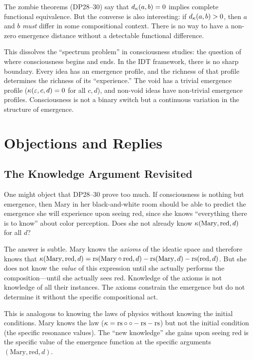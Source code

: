 The zombie theorems (DP28--30) say that $d_{\kappa}(a,b) = 0$
implies complete functional equivalence.  But the converse is
also interesting: if $d_{\kappa}(a,b) > 0$, then $a$ and $b$
\emph{must} differ in some compositional context.  There is no
way to have a non-zero emergence distance without a detectable
functional difference.

This dissolves the ``spectrum problem'' in consciousness studies:
the question of where consciousness begins and ends.  In the IDT
framework, there is no sharp boundary.  Every idea has an emergence
profile, and the richness of that profile determines the richness
of its ``experience.''  The void has a trivial emergence profile
($\kappa(\varepsilon, c, d) = 0$ for all $c, d$), and non-void ideas
have non-trivial emergence profiles.  Consciousness is not a
binary switch but a continuous variation in the structure of
emergence.

\section{Objections and Replies}

\subsection{The Knowledge Argument Revisited}

One might object that DP28--30 prove too much.  If consciousness is
nothing but emergence, then Mary in her black-and-white room should
be able to predict the emergence she will experience upon seeing red,
since she knows ``everything there is to know'' about color perception.
Does she not already know $\kappa(\mathrm{Mary}, \mathrm{red}, d)$
for all $d$?

The answer is subtle.  Mary knows the \emph{axioms} of the ideatic
space and therefore knows that $\kappa(\mathrm{Mary}, \mathrm{red}, d)
= \mathrm{rs}(\mathrm{Mary} \circ \mathrm{red}, d) - \mathrm{rs}(\mathrm{Mary}, d) -
\mathrm{rs}(\mathrm{red}, d)$.  But she does not know the \emph{value} of
this expression until she actually performs the composition---until
she actually sees red.  Knowledge of the axioms is not knowledge of
all their instances.  The axioms constrain the emergence but do not
determine it without the specific compositional act.

This is analogous to knowing the laws of physics without knowing the
initial conditions.  Mary knows the law ($\kappa = \mathrm{rs} \circ \circ -
\mathrm{rs} - \mathrm{rs}$) but not the initial condition (the specific resonance
values).  The ``new knowledge'' she gains upon seeing red is the
specific value of the emergence function at the specific arguments
$(\mathrm{Mary}, \mathrm{red}, d)$.

